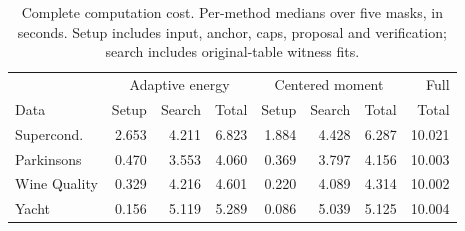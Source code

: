\begin{table}[t]\centering\small
\caption{Complete computation cost. Per-method medians over five masks, in seconds. Setup includes input, anchor, caps, proposal and verification; search includes original-table witness fits.}
\label{tab:contraction-costs-v88}
\begin{tabular}{lrrrrrrr}\toprule
&\multicolumn{3}{c}{Adaptive energy}&\multicolumn{3}{c}{Centered moment}&Full\\
Data&Setup&Search&Total&Setup&Search&Total&Total\\\midrule
Supercond. & 2.653 & 4.211 & 6.823 & 1.884 & 4.428 & 6.287 & 10.021\\
Parkinsons & 0.470 & 3.553 & 4.060 & 0.369 & 3.797 & 4.156 & 10.003\\
Wine Quality & 0.329 & 4.216 & 4.601 & 0.220 & 4.089 & 4.314 & 10.002\\
Yacht & 0.156 & 5.119 & 5.289 & 0.086 & 5.039 & 5.125 & 10.004\\
\bottomrule\end{tabular}\end{table}

